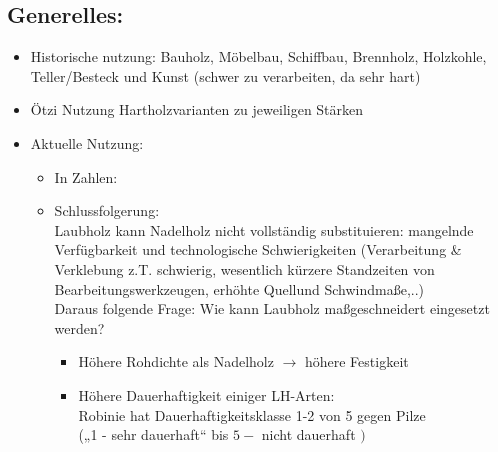 \documentclass[fleqn,twoside]{article}
\begin{document}
    \subsection{Generelles:}
        \begin{itemize}
            \item Historische nutzung: Bauholz, Möbelbau, Schiffbau, Brennholz, Holzkohle, Teller/Besteck und Kunst (schwer zu verarbeiten, da sehr hart)
            \item Ötzi Nutzung Hartholzvarianten zu jeweiligen Stärken
            \item Aktuelle Nutzung:
                \begin{itemize}
                    \item In Zahlen:\vspace*{3mm} \\
                             \vspace{1mm}
                    \item Schlussfolgerung:\\
                        Laubholz kann Nadelholz nicht vollständig substituieren: mangelnde Verfügbarkeit und technologische Schwierigkeiten (Verarbeitung \& Verklebung z.T. schwierig, wesentlich kürzere Standzeiten von Bearbeitungswerkzeugen, erhöhte Quellund Schwindmaße,..)\\
                        Daraus folgende Frage:
                            Wie kann Laubholz maßgeschneidert eingesetzt werden?
                                \begin{itemize}
                                    \item Höhere Rohdichte als Nadelholz $\rightarrow$ höhere Festigkeit
                                    \item Höhere Dauerhaftigkeit einiger LH-Arten:\\
                                        Robinie hat Dauerhaftigkeitsklasse 1-2 von 5 gegen Pilze\\
                                        („1 - sehr dauerhaft“ bis ${ } 5-$ nicht dauerhaft $)$
                                \end{itemize}
                \end{itemize}
        \end{itemize}
\end{document}
